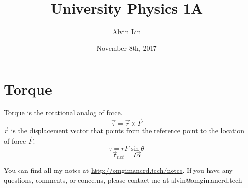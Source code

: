 \documentclass{math}
\title{University Physics 1A}
\author{Alvin Lin}
\date{November 8th, 2017}
\begin{document}
\maketitle

\section*{Torque}
Torque is the rotational analog of force.
\[ \vec{\tau} = \vec{r}\times\vec{F} \]
\( \vec{r} \) is the displacement vector that points from the reference point to
the location of force \( \vec{F} \).
\[ \tau = rF\sin\theta \]
\[ \vec{\tau}_{net} = I\vec{\alpha} \]

\begin{center}
  You can find all my notes at \url{http://omgimanerd.tech/notes}. If you have
  any questions, comments, or concerns, please contact me at
  alvin@omgimanerd.tech
\end{center}
\end{document}
